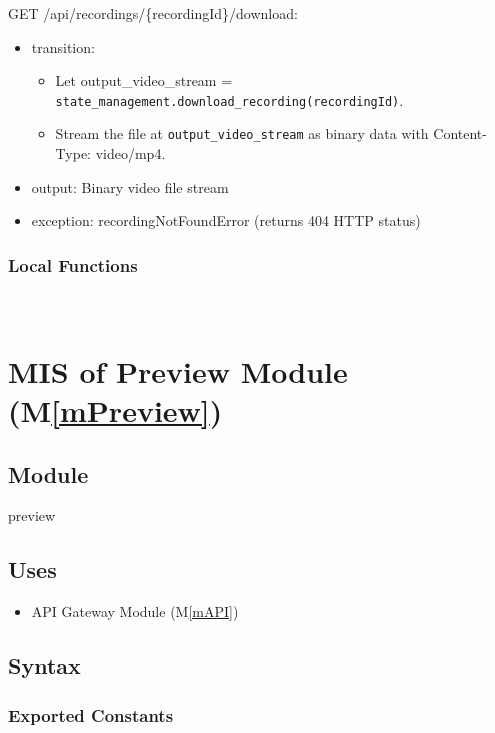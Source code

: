 \documentclass[12pt, titlepage]{article}
\newcommand{\mref}[1]{M\ref{#1}}
\begin{document}
\noindent GET /api/recordings/\{recordingId\}/download:
\begin{itemize}
  \item transition:
        \begin{itemize}
          \item Let output\_video\_stream =
                \texttt{state\_management.download\_recording(recordingId)}.
          \item Stream the file at \texttt{output\_video\_stream} as binary data with
                Content-Type: video/mp4.
        \end{itemize}
  \item output: Binary video file stream
  \item exception: recordingNotFoundError (returns 404 HTTP status)
\end{itemize}

\subsubsection{Local Functions}

\ \


\section{MIS of Preview Module (\mref{mPreview})}

\subsection{Module}

preview

\subsection{Uses}

\begin{itemize}
  \item API Gateway Module (\mref{mAPI})
\end{itemize}

\subsection{Syntax}

\subsubsection{Exported Constants}
\end{document}
